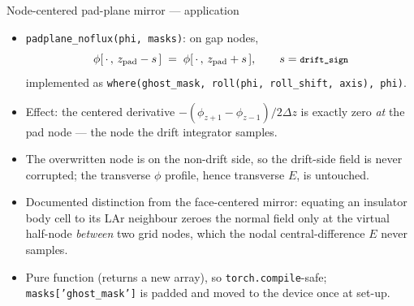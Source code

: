 \documentclass[10pt,aspectratio=169]{beamer}
\newcommand{\ti}[1]{\texttt{\footnotesize #1}}
\begin{document}
\begin{frame}{Node-centered pad-plane mirror --- application}
  \begin{itemize}\small
  \item \ti{padplane\_noflux(phi, masks)}: on gap nodes,
        \[\phi[\,\cdot\,,\,z_{\text{pad}}-s\,]\;=\;\phi[\,\cdot\,,\,z_{\text{pad}}+s\,],
          \qquad s=\ti{drift\_sign}\]
        implemented as \ti{where(ghost\_mask, roll(phi, roll\_shift, axis), phi)}.
  \item Effect: the centered derivative
        $-\left(\phi_{z+1}-\phi_{z-1}\right)/2\Delta z$ is exactly zero \emph{at} the pad
        node --- the node the drift integrator samples.
  \item The overwritten node is on the non-drift side, so the drift-side field is never
        corrupted; the transverse $\phi$ profile, hence transverse $E$, is untouched.
  \item Documented distinction from the face-centered mirror: equating an insulator body
        cell to its LAr neighbour zeroes the normal field only at the virtual half-node
        \emph{between} two grid nodes, which the nodal central-difference $E$ never samples.
  \item Pure function (returns a new array), so \ti{torch.compile}-safe;
        \ti{masks['ghost\_mask']} is padded and moved to the device once at set-up.
  \end{itemize}
\end{frame}
\end{document}
